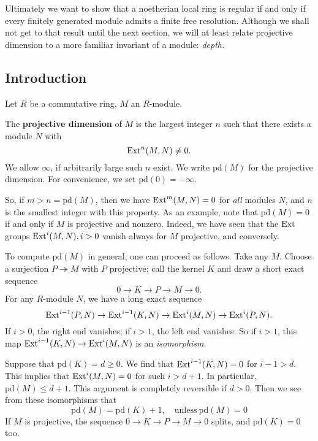 Ultimately we want to show that a noetherian local ring is regular if and only
if every finitely generated module admits a finite free resolution. Although we
shall not get to that result until the next section, we will at least relate
projective dimension to a more familiar invariant of a module: \emph{depth.}

\subsection{Introduction}
\newcommand{\pr}{\mathrm{pd}}
Let $R$ be a commutative ring, $M$ an $R$-module.

\begin{definition}
The \textbf{projective dimension} of $M$ is the largest integer
$n$ such that
there exists  a module $N$ with
\[ \operatorname{Ext}^n(M,N) \neq 0.  \]
We allow $\infty$, if arbitrarily large such $n$ exist. 
We write $\pr(M)$ for the projective dimension. For convenience, we set $\pr(0)
= - \infty$.
\end{definition}

So, if $m> n = \pr(M)$, then we have $\operatorname{Ext}^m(M, N) = 0$ for \emph{all} modules $N$, and
$n$ is the smallest integer with this property.
As an example, note that $\pr(M) = 0$ if and only if $M$ is projective and
nonzero. Indeed, we have seen that
the $\operatorname{Ext}$ groups
$\operatorname{Ext}^i(M,N), i >0$
vanish always for $M$ projective, and conversely.

To compute $\pr(M)$ in general, one can proceed as follows.
Take any $M$. Choose a surjection $P \twoheadrightarrow M$ with
$P$ projective;
call the kernel $K$ and draw a short exact sequence
\[ 0 \to K \to P \to M \to 0.  \]
For any $R$-module $N$, we have a long exact sequence
\[ \operatorname{Ext}^{i-1}(P,N) \to \operatorname{Ext}^{i-1}(K,N) \to \operatorname{Ext}^i(M,N) \to
\operatorname{Ext}^i(P, N). \]
If $i >0$, the right end vanishes; if $i >1$, the left end
vanishes. So if $i
>1$, this map $\operatorname{Ext}^{i-1}(K,N) \to \operatorname{Ext}^i(M,N)$ is an
\emph{isomorphism}.

Suppose that $\pr(K) = d \geq 0$. We find that
$\operatorname{Ext}^{i-1}(K,N)=0$ for $i-1
> d$.
This implies that $\operatorname{Ext}^i(M,N) = 0$ for such $i > d+1$. In
particular, $\pr(M)
\leq d+1$.
This argument is completely reversible if $d >0$.
Then we see from these isomorphisms that
\begin{equation} \label{pdeq} \boxed{\pr(M) = \pr(K)+1}, \quad \mathrm{unless} \ \pr(M)=0
\end{equation}
If $M$ is projective, the sequence $0 \to K \to P \to M \to 0$
splits, and
$\pr(K)=0$ too.

